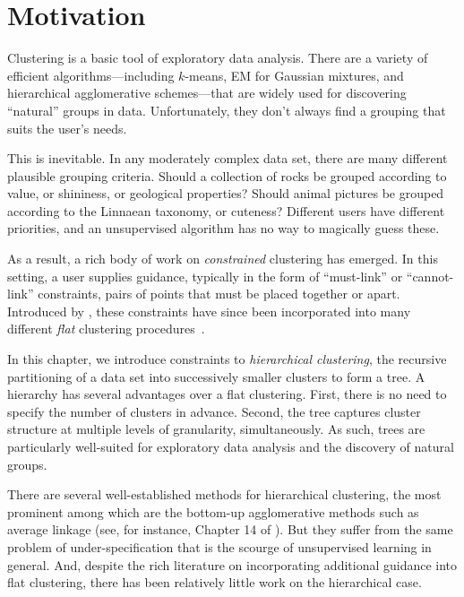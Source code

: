 
\section{Motivation}
Clustering is a basic tool of exploratory data analysis. There are a variety of efficient algorithms---including $k$-means, EM for Gaussian mixtures, and hierarchical agglomerative schemes---that are widely used for discovering ``natural'' groups in data. Unfortunately, they don't always find a grouping that suits the user's needs.

This is inevitable. In any moderately complex data set, there are many different plausible grouping criteria. Should a collection of rocks be grouped according to value, or shininess, or geological properties? Should animal pictures be grouped according to the Linnaean taxonomy, or cuteness? Different users have different priorities, and an unsupervised algorithm has no way to magically guess these.

As a result, a rich body of work on {\it constrained} clustering has emerged.
In this setting, a user supplies guidance, typically in the form of ``must-link'' or ``cannot-link'' constraints, pairs of points that must be placed together or apart. Introduced by \citet{Wagstaff2001}, these constraints have since been incorporated into many different {\it flat} clustering procedures~\citep{Wagstaff2000,Bansal2004,Basu2004,Kulis2009,Biswas2004}.

In this chapter, we introduce constraints to {\it hierarchical clustering}, the recursive partitioning of a data set into successively smaller clusters to form a tree. A hierarchy has several advantages over a flat clustering. First, there is no need to specify the number of clusters in advance. Second, the tree captures cluster structure at multiple levels of granularity, simultaneously. As such, trees are particularly well-suited for exploratory data analysis and the discovery of natural groups.

There are several well-established methods for hierarchical clustering, the most prominent among which are the bottom-up agglomerative methods such as average linkage (see, for instance, Chapter 14 of \citet{Hastie2009}). But they suffer from the same problem of under-specification that is the scourge of unsupervised learning in general. And, despite the rich literature on incorporating additional guidance into flat clustering, there has been relatively little work on the hierarchical case.

